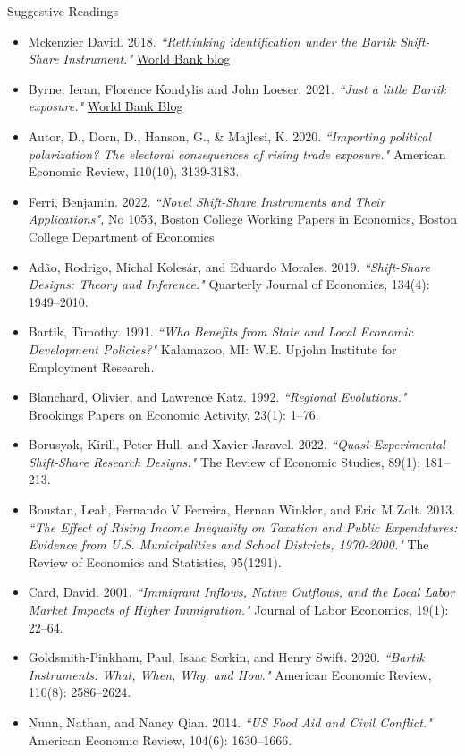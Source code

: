 \documentclass[dvipsnames,hyperref={pdfpagelabels=false}]{beamer}
\begin{document}
	\begin{frame}{Suggestive Readings}
	\tiny
	\begin{itemize}
		\item Mckenzier David. 2018. \textit{``Rethinking identification under the Bartik Shift-Share Instrument."} \href{https://blogs.worldbank.org/impactevaluations/rethinking-identification-under-bartik-shift-share-instrument}{World Bank blog}
		\item Byrne, Ieran, Florence Kondylis and John Loeser. 2021. \textit{``Just a little Bartik exposure."} \href{https://blogs.worldbank.org/impactevaluations/just-little-bartik-exposure}{World Bank Blog}
		\item Autor, D., Dorn, D., Hanson, G., \& Majlesi, K. 2020. \textit{``Importing political polarization? The electoral consequences of rising trade exposure."} American Economic Review, 110(10), 3139-3183.
		\item Ferri, Benjamin. 2022. \textit{``Novel Shift-Share Instruments and Their Applications",} No 1053, Boston College Working Papers in Economics, Boston College Department of Economics
		\item Adão, Rodrigo, Michal Kolesár, and Eduardo Morales. 2019. \textit{``Shift-Share Designs: Theory and Inference."} Quarterly Journal of Economics, 134(4): 1949–2010.
		\item Bartik, Timothy. 1991. \textit{``Who Benefits from State and Local Economic Development Policies?"} Kalamazoo, MI: W.E. Upjohn Institute for Employment Research.
		\item Blanchard, Olivier, and Lawrence Katz. 1992. \textit{``Regional Evolutions."} Brookings Papers on Economic Activity, 23(1): 1–76.
		\item Borusyak, Kirill, Peter Hull, and Xavier Jaravel. 2022. \textit{``Quasi-Experimental Shift-Share Research Designs."} The Review of Economic Studies, 89(1): 181–213.
		\item Boustan, Leah, Fernando V Ferreira, Hernan Winkler, and Eric M Zolt. 2013. \textit{``The Effect of Rising Income Inequality on Taxation and Public Expenditures: Evidence from U.S. Municipalities and School Districts, 1970-2000."} The Review of Economics and Statistics, 95(1291).
		\item Card, David. 2001. \textit{``Immigrant Inflows, Native Outflows, and the Local Labor Market Impacts of Higher Immigration."} Journal of Labor Economics, 19(1): 22–64.
		\item Goldsmith-Pinkham, Paul, Isaac Sorkin, and Henry Swift. 2020. \textit{``Bartik Instruments: What, When, Why, and How."} American Economic Review, 110(8): 2586–2624.
		\item Nunn, Nathan, and Nancy Qian. 2014. \textit{``US Food Aid and Civil Conflict."} American Economic Review, 104(6): 1630–1666.
	\end{itemize}
\end{frame}
\end{document}
